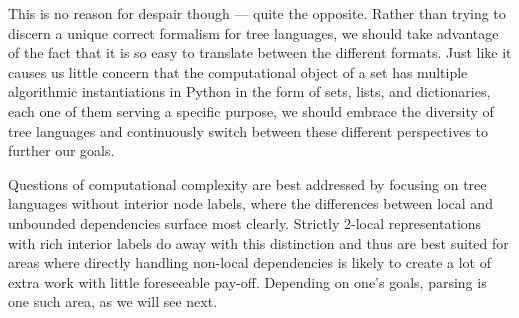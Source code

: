 This is no reason for despair though --- quite the opposite.
Rather than trying to discern a unique correct formalism for tree languages, we should take advantage of the fact that it is so easy to translate between the different formats.
Just like it causes us little concern that the computational object of a set has multiple algorithmic instantiations in Python in the form of sets, lists, and dictionaries, each one of them serving a specific purpose, we should embrace the diversity of tree languages and continuously switch between these different perspectives to further our goals.

Questions of computational complexity are best addressed by focusing on tree languages without interior node labels, where the differences between local and unbounded dependencies surface most clearly.
Strictly 2-local representations with rich interior labels do away with this distinction and thus are best suited for areas where directly handling non-local dependencies is likely to create a lot of extra work with little foreseeable pay-off.
Depending on one's goals, parsing is one such area, as we will see next.
